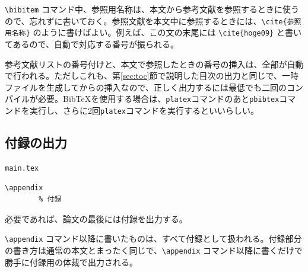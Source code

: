 \verb|\bibitem| コマンド中、参照用名称は、本文から参考文献を参照するときに使うので、忘れずに書いておく。参照文献を本文中に参照するときには、\verb|\cite{参照用名称}| のように書けばよい。例えば、この文の末尾には \verb|\cite{hoge09}| と書いてあるので、自動で対応する番号が振られる\cite{hoge09}\cite{hoge08}。

参考文献リストの番号付けと、本文で参照したときの番号の挿入は、全部が自動で行われる。ただしこれも、第\ref{sec:toc}節で説明した目次の出力と同じで、一時ファイルを生成してからの挿入なので、正しく出力するには最低でも二回のコンパイルが必要。BibTeXを使用する場合は、\verb|platex|コマンドのあと\verb|pbibtex|コマンドを実行し、さらに2回\verb|platex|コマンドを実行するといいらしい。



\subsection{付録の出力}

\begin{itembox}[l]{{\tt main.tex}}
\begin{verbatim}
\appendix
		% 付録
\end{verbatim}
\end{itembox}

必要であれば、論文の最後には付録を出力する。

\verb|\appendix| コマンド以降に書いたものは、すべて付録として扱われる。付録部分の書き方は通常の本文とまったく同じで、\verb|\appendix| コマンド以降に書くだけで勝手に付録用の体裁で出力される。

